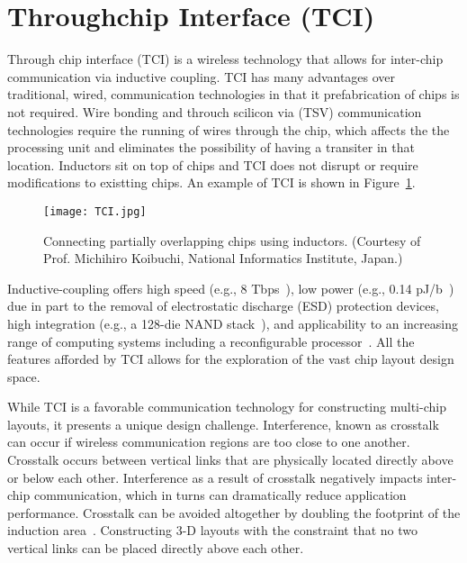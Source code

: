 \section{Throughchip Interface (TCI)}
\label{sec:background}

Through chip interface (TCI) is a wireless technology that allows for inter-chip
communication via inductive coupling.  TCI has many advantages over traditional,
wired, communication technologies in that it prefabrication of chips is not
required.  Wire bonding and throuch scilicon via (TSV) communication
technologies require the running of wires through the chip, which affects the the
processing unit and eliminates the possibility of having a transiter in that
location.  Inductors sit on top of chips and TCI does not disrupt or require
modifications to existting chips. An example of TCI is shown in
Figure~\ref{fig:tci}.

\begin{figure}[h]
        \centering
        \texttt{[image: TCI.jpg]}
	\caption{Connecting partially overlapping chips using inductors.
(Courtesy of Prof. Michihiro Koibuchi, National Informatics Institute, Japan.)}
        \label{fig:tci}
\end{figure}

 Inductive-coupling offers high speed (e.g., 8
Tbps~\cite{MiuraISSCC2010}), low power (e.g., 0.14 pJ/b~\cite{MiuraISSCC2007})
due in part to the removal of electrostatic discharge (ESD) protection devices,
high integration (e.g., a 128-die NAND stack~\cite{KurodaISSCC2010}), and
applicability to an increasing range of computing systems including a
reconfigurable processor~\cite{MiraMICRO2013}.  All the features afforded by TCI
allows for the exploration of the vast chip layout design space.

While TCI is a favorable communication technology for constructing multi-chip
layouts, it presents a unique design challenge.  Interference, known as
crosstalk can occur if wireless communication regions are too close to one
another. Crosstalk occurs between vertical links that are physically located
directly above or below each other.  Interference as a result of crosstalk
negatively impacts inter-chip communication, which in turns can dramatically
reduce application performance.  Crosstalk can be avoided altogether by doubling
the footprint of the induction area~\cite{Kuroda2007,ISSCC2009}.  Constructing 3-D layouts with the constraint that no two
vertical links can be placed directly above each other. 

